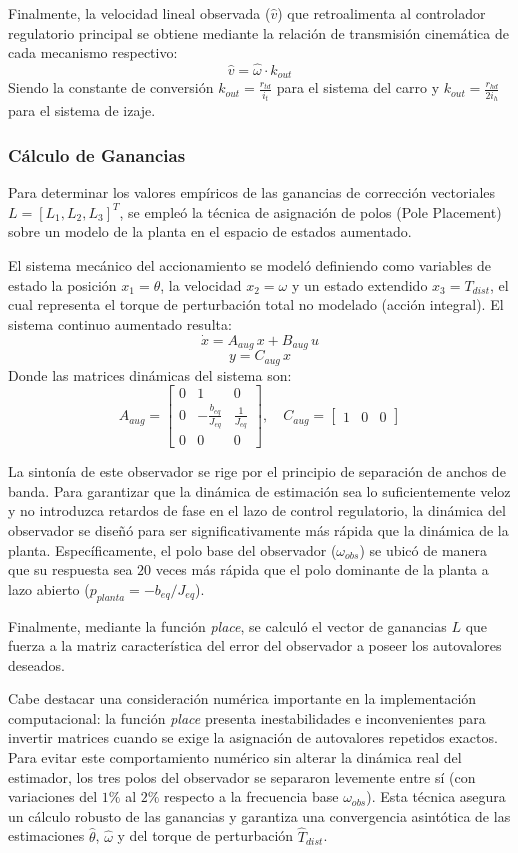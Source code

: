 \documentclass[11pt]{article}                                    %
\begin{document}
Finalmente, la velocidad lineal observada ($\hat{v}$) que retroalimenta al controlador regulatorio principal se obtiene mediante la relación de transmisión cinemática de cada mecanismo respectivo:
$$\hat{v} = \hat{\omega} \cdot k_{out}$$
Siendo la constante de conversión $k_{out} = \frac{r_{td}}{i_t}$ para el sistema del carro y $k_{out} = \frac{r_{hd}}{2 i_h}$ para el sistema de izaje.

\subsubsection{Cálculo de Ganancias}
Para determinar los valores empíricos de las ganancias de corrección vectoriales $L = [L_1, L_2, L_3]^T$, se empleó la técnica de asignación de polos (Pole Placement) sobre un modelo de la planta en el espacio de estados aumentado.

El sistema mecánico del accionamiento se modeló definiendo como variables de estado la posición $x_1 = \theta$, la velocidad $x_2 = \omega$ y un estado extendido $x_3 = T_{dist}$, el cual representa el torque de perturbación total no modelado (acción integral). El sistema continuo aumentado resulta:
$$\dot{x} = A_{aug} \, x + B_{aug} \, u$$
$$y = C_{aug} \, x$$
Donde las matrices dinámicas del sistema son:
$$A_{aug} = \begin{bmatrix} 0 & 1 & 0 \\ 0 & -\frac{b_{eq}}{J_{eq}} & \frac{1}{J_{eq}} \\ 0 & 0 & 0 \end{bmatrix}, \quad C_{aug} = \begin{bmatrix} 1 & 0 & 0 \end{bmatrix}$$

La sintonía de este observador se rige por el principio de separación de anchos de banda. Para garantizar que la dinámica de estimación sea lo suficientemente veloz y no introduzca retardos de fase en el lazo de control regulatorio, la dinámica del observador se diseñó para ser significativamente más rápida que la dinámica de la planta. Específicamente, el polo base del observador ($\omega_{obs}$) se ubicó de manera que su respuesta sea $20$ veces más rápida que el polo dominante de la planta a lazo abierto ($p_{planta} = -b_{eq}/J_{eq}$).

Finalmente, mediante la función \textit{place}, se calculó el vector de ganancias $L$ que fuerza a la matriz característica del error del observador a poseer los autovalores deseados. 

Cabe destacar una consideración numérica importante en la implementación computacional: la función \textit{place} presenta inestabilidades e inconvenientes para invertir matrices cuando se exige la asignación de autovalores repetidos exactos. Para evitar este comportamiento numérico sin alterar la dinámica real del estimador, los tres polos del observador se separaron levemente entre sí (con variaciones del $1\%$ al $2\%$ respecto a la frecuencia base $\omega_{obs}$). Esta técnica asegura un cálculo robusto de las ganancias y garantiza una convergencia asintótica de las estimaciones $\hat{\theta}$, $\hat{\omega}$ y del torque de perturbación $\hat{T}_{dist}$.
\end{document}
